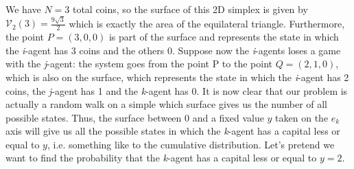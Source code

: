 We have $N=3$ total coins, so the surface of this 2D simplex is given by $\mathcal{V}_{2}\left(3\right) = \frac{9\sqrt{3}}{2}$ which is exactly the area of the equilateral triangle.
Furthermore, the point $P = (3, 0, 0)$ is part of the surface and represents the state in which the \emph{i}-agent has 3 coins and the others 0.
Suppose now the \emph{i}-agents loses a game with the \emph{j}-agent: the system goes from the point P to the point $Q = (2, 1, 0)$, which is also on the surface, which represents the state in which the \emph{i}-agent has 2 coins, the \emph{j}-agent has 1 and the \emph{k}-agent has 0.
It is now clear that our problem is actually a random walk on a simple which surface gives us the number of all possible states.
Thus, the surface between 0 and a fixed value $y$ taken on the $e_k$ axis will give us all the possible states in which the \emph{k}-agent has a capital less or equal to $y$, i.e. something like to the cumulative distribution.
Let's pretend we want to find the probability that the \emph{k}-agent has a capital less or equal to $y=2$.
